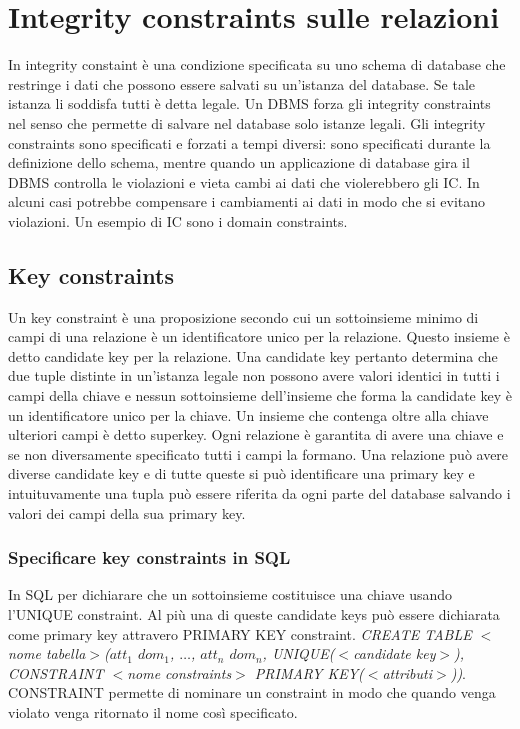 \section{Integrity constraints sulle relazioni}
In integrity constaint \`e una condizione specificata su uno schema di database che restringe i dati che possono essere salvati su un'istanza del database. Se tale istanza li soddisfa tutti \`e detta legale. Un DBMS 
forza gli integrity constraints nel senso che permette di salvare nel database solo istanze legali. Gli integrity constraints sono specificati e forzati a tempi diversi: sono specificati durante la definizione dello 
schema, mentre quando un applicazione di database gira il DBMS controlla le violazioni e vieta cambi ai dati che violerebbero gli IC. In alcuni casi potrebbe compensare i cambiamenti ai dati in modo che si 
evitano violazioni. Un esempio di IC sono i domain constraints.
\subsection{Key constraints}
Un key constraint \`e una proposizione secondo cui un sottoinsieme minimo di campi di una relazione \`e un identificatore unico per la relazione. Questo insieme \`e detto candidate key per la relazione. Una 
candidate key pertanto determina che due tuple distinte in un'istanza legale non possono avere valori identici in tutti i campi della chiave e nessun sottoinsieme dell'insieme che forma la candidate key \`e un 
identificatore unico per la chiave. Un insieme che contenga oltre alla chiave ulteriori campi \`e detto superkey. Ogni relazione \`e garantita di avere una chiave e se non diversamente specificato tutti i campi la 
formano. Una relazione pu\`o avere diverse candidate key e di tutte queste si pu\`o identificare una primary key e intuituvamente una tupla pu\`o essere riferita da ogni parte del database salvando i valori dei 
campi della sua primary key. 
\subsubsection{Specificare key constraints in SQL}
In SQL per dichiarare che un sottoinsieme costituisce una chiave usando l'UNIQUE constraint. Al pi\`u una di queste candidate keys pu\`o essere dichiarata come primary key attravero PRIMARY KEY constraint. 
\emph{CREATE TABLE $<$nome tabella$>$($att_1$  $dom_1$, $\dots$, $att_n$  $dom_n$, UNIQUE($<$candidate key$>$), CONSTRAINT $<$nome constraints$>$ PRIMARY KEY($<$attributi$>$))}. 
CONSTRAINT permette di nominare un constraint in modo che quando venga violato venga ritornato il nome cos\`i specificato.
